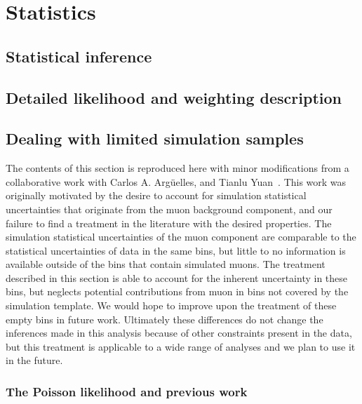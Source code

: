 \chapter{Statistics}\label{chapter:statistics}
\section{Statistical inference\label{sec:statistics}}
\begingroup
\graphicspath{{results/HESE_Final_Paper/}}

\endgroup

\section{Detailed likelihood and weighting description\label{sec:likelihood}}
\begingroup
\graphicspath{{results/HESE_Final_Paper/}}

\endgroup

\section{Dealing with limited simulation samples\label{sec:limited_simulation}}
The contents of this section is reproduced here with minor modifications from a collaborative work with Carlos A. Argüelles, and Tianlu Yuan~\cite{Arguelles:2019izp}.
This work was originally motivated by the desire to account for simulation statistical uncertainties that originate from the muon background component, and our failure to find a treatment in the literature with the desired properties.
The simulation statistical uncertainties of the muon component are comparable to the statistical uncertainties of data in the same bins, but little to no information is available outside of the bins that contain simulated muons.
The treatment described in this section is able to account for the inherent uncertainty in these bins, but neglects potential contributions from muon in bins not covered by the simulation template.
We would hope to improve upon the treatment of these empty bins in future work.
Ultimately these differences do not change the inferences made in this analysis because of other constraints present in the data, but this treatment is applicable to a wide range of analyses and we plan to use it in the future.

\begingroup
\graphicspath{{results/mcllh_paper/}}

\endgroup

\subsection{The Poisson likelihood and previous work\label{sec:mc_intro}}
\begingroup
\graphicspath{{results/mcllh_paper/}}

\endgroup

